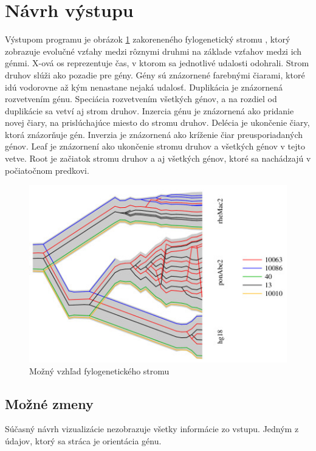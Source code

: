 \section{Návrh výstupu}
Výstupom programu je obrázok \ref{obr:tree} zakoreneného fylogenetický stromu , ktorý zobrazuje evolučné vzťahy medzi rôznymi druhmi na základe vzťahov medzi ich génmi.
X-ová os reprezentuje čas, v ktorom sa jednotlivé udalosti odohrali.
\newline
Strom druhov slúži ako pozadie pre gény.
\newline
Gény sú znázornené farebnými čiarami, ktoré idú vodorovne až kým nenastane nejaká udalosť.
\newline
Duplikácia je znázornená rozvetvením génu. 
\newline
Speciácia rozvetvením všetkých génov, a na rozdiel od duplikácie sa vetví aj strom druhov.
\newline 
Inzercia génu je znázornená ako pridanie novej čiary, na prislúchajúce miesto do stromu druhov.
\newline
Delécia je ukončenie čiary, ktorá znázorňuje gén.
\newline 
Inverzia je znázornená ako kríženie čiar preusporiadaných génov.
\newline 
Leaf je znázornení ako ukončenie stromu druhov a všetkých génov v tejto vetve.
\newline
Root je začiatok stromu druhov a aj všetkých génov, ktoré sa nachádzajú v počiatočnom predkovi.
\begin{figure}
\centerline{\includegraphics[width=1\textwidth]{images/DUP-tube-tree}}
\caption{Možný vzhľad fylogenetického stromu \cite{Vinar2010}}\label{obr:tree}
\end{figure}
\subsection{Možné zmeny}
Súčasný návrh vizualizácie nezobrazuje všetky informácie zo vstupu. Jedným z údajov, 
ktorý sa stráca je orientácia génu.